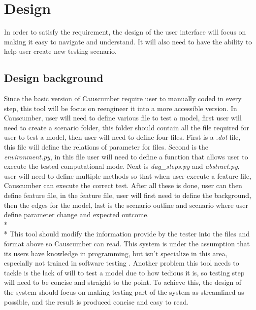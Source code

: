 \chapter{Design}
In order to satisfy the requirement, the design of the user interface will focus on making it easy to navigate and understand. It will also need to have the ability to help user create new testing scenario.
\section{Design background}
Since the basic version of Causcumber require user to manually coded in every step, this tool will be focus on reengineer it into a more accessible version. In Causcumber, user will need to define various file to test a model, first user will need to create a scenario folder, this folder should contain all the file required for user to test a model, then user will need to define four files. First is a \textsl{.dot} file, this file will define the relations of parameter for files. Second is the \textsl{environment.py}, in this file user will need to define a function that allows user to execute the tested computational mode. Next is \textsl{dag\_steps.py} and \textsl{abstract.py}, user will need to define multiple methods so that when user execute a feature file, Causcumber can execute the correct test. After all these is done, user can then define feature file, in the feature file, user will first need to define the background, then the edges for the model, last is the scenario outline and scenario where user define parameter change and expected outcome.\\*\\*
This tool should modify the information provide by the tester into the files and format above so Causcumber can read. This system is under the assumption that its users have knowledge in programming, but isn’t specialize in this area, especially not trained in software testing \cite{Reference11}. Another problem this tool needs to tackle is the lack of will to test a model due to how tedious it is, so testing step will need to be concise and straight to the point. To achieve this, the design of the system should focus on making testing part of the system as streamlined as possible, and the result is produced concise and easy to read.

